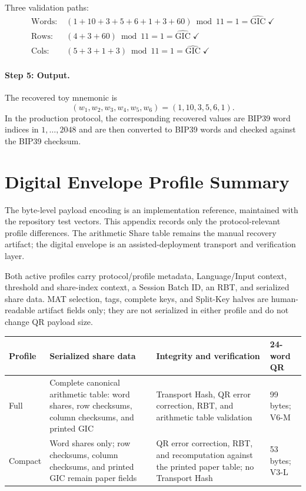 \documentclass[11pt]{article}
\begin{document}
Three validation paths:
\begin{align*}
\text{Words:}\; &(1{+}10{+}3{+}5{+}6{+}1{+}3{+}60) \bmod 11 = 1 = \hat{\text{GIC}} \;\checkmark \\
\text{Rows:}\; &(4{+}3{+}60) \bmod 11 = 1 = \hat{\text{GIC}} \;\checkmark \\
\text{Cols:}\; &(5{+}3{+}1{+}3) \bmod 11 = 1 = \hat{\text{GIC}} \;\checkmark
\end{align*}

\paragraph{Step 5: Output.} The recovered toy mnemonic is
\[
    (w_1,w_2,w_3,w_4,w_5,w_6) = (1,10,3,5,6,1).
\]
In the production protocol, the corresponding recovered values are BIP39 word indices in $1,\ldots,2048$ and are then converted to BIP39 words and checked against the BIP39 checksum.

\section{Digital Envelope Profile Summary}
\label{app:encoding}

The byte-level payload encoding is an implementation reference, maintained with the repository test vectors. This appendix records only the protocol-relevant profile differences. The arithmetic Share table remains the manual recovery artifact; the digital envelope is an assisted-deployment transport and verification layer.

Both active profiles carry protocol/profile metadata, Language/Input context, threshold and share-index context, a Session Batch ID, an RBT, and serialized share data. MAT selection, tags, complete keys, and Split-Key halves are human-readable artifact fields only; they are not serialized in either profile and do not change QR payload size.

\begin{center}
\small
\begin{tabular}{@{}p{}p{}p{}p{}@{}}
\toprule
\textbf{Profile} & \textbf{Serialized share data} & \textbf{Integrity and verification} & \textbf{24-word QR} \\ \midrule
Full & Complete canonical arithmetic table: word shares, row checksums, column checksums, and printed GIC & Transport Hash, QR error correction, RBT, and arithmetic table validation & 99 bytes; V6-M \\
Compact & Word shares only; row checksums, column checksums, and printed GIC remain paper fields & QR error correction, RBT, and recomputation against the printed paper table; no Transport Hash & 53 bytes; V3-L \\
\bottomrule
\end{tabular}
\end{center}
\end{document}
